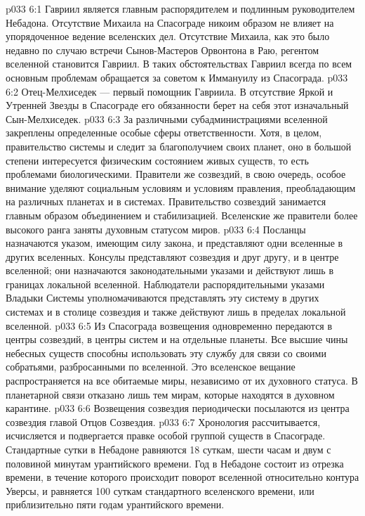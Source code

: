\vs p033 6:1 Гавриил является главным распорядителем и подлинным руководителем Небадона. Отсутствие Михаила на Спасограде никоим образом не влияет на упорядоченное ведение вселенских дел. Отсутствие Михаила, как это было недавно по случаю встречи Сынов\hyp{}Мастеров Орвонтона в Раю, регентом вселенной становится Гавриил. В таких обстоятельствах Гавриил всегда по всем основным проблемам обращается за советом к Иммануилу из Спасограда.
\vs p033 6:2 Отец\hyp{}Мелхиседек --- первый помощник Гавриила. В отсутствие Яркой и Утренней Звезды в Спасограде его обязанности берет на себя этот изначальный Сын\hyp{}Мелхиседек.
\vs p033 6:3 \pc За различными субадминистрациями вселенной закреплены определенные особые сферы ответственности. Хотя, в целом, правительство системы и следит за благополучием своих планет, оно в большой степени интересуется физическим состоянием живых существ, то есть проблемами биологическими. Правители же созвездий, в свою очередь, особое внимание уделяют социальным условиям и условиям правления, преобладающим на различных планетах и в системах. Правительство созвездий занимается главным образом объединением и стабилизацией. Вселенские же правители более высокого ранга заняты духовным статусом миров.
\vs p033 6:4 \pc Посланцы назначаются указом, имеющим силу закона, и представляют одни вселенные в других вселенных. Консулы представляют созвездия и друг другу, и в центре вселенной; они назначаются законодательными указами и действуют лишь в границах локальной вселенной. Наблюдатели распорядительными указами Владыки Системы уполномачиваются представлять эту систему в других системах и в столице созвездия и также действуют лишь в пределах локальной вселенной.
\vs p033 6:5 \pc Из Спасограда возвещения одновременно передаются в центры созвездий, в центры систем и на отдельные планеты. Все высшие чины небесных существ способны использовать эту службу для связи со своими собратьями, разбросанными по вселенной. Это вселенское вещание распространяется на все обитаемые миры, независимо от их духовного статуса. В планетарной связи отказано лишь тем мирам, которые находятся в духовном карантине.
\vs p033 6:6 Возвещения созвездия периодически посылаются из центра созвездия главой Отцов Созвездия.
\vs p033 6:7 \pc Хронология рассчитывается, исчисляется и подвергается правке особой группой существ в Спасограде. Стандартные сутки в Небадоне равняются 18 суткам, шести часам и двум с половиной минутам урантийского времени. Год в Небадоне состоит из отрезка времени, в течение которого происходит поворот вселенной относительно контура Уверсы, и равняется 100 суткам стандартного вселенского времени, или приблизительно пяти годам урантийского времени.
